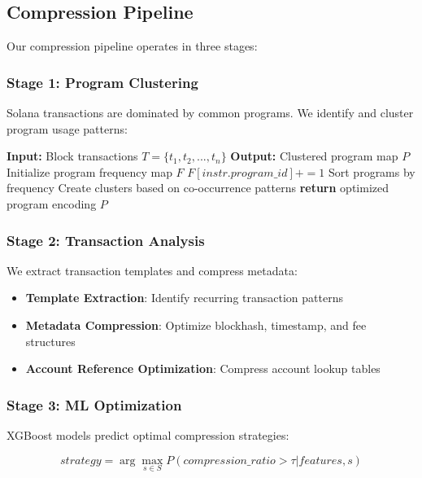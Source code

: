 \documentclass[11pt,a4paper]{article}
\begin{document}
\subsection{Compression Pipeline}

Our compression pipeline operates in three stages:

\subsubsection{Stage 1: Program Clustering}
Solana transactions are dominated by common programs. We identify and cluster program usage patterns:

\begin{algorithm}
\caption{Program Clustering Algorithm}
\begin{algorithmic}[1]
\STATE \textbf{Input:} Block transactions $T = \{t_1, t_2, ..., t_n\}$
\STATE \textbf{Output:} Clustered program map $P$
\STATE Initialize program frequency map $F$
        \STATE $F[instr.program\_id] += 1$
    \ENDFOR
\ENDFOR
\STATE Sort programs by frequency
\STATE Create clusters based on co-occurrence patterns
\STATE \textbf{return} optimized program encoding $P$
\end{algorithmic}
\end{algorithm}

\subsubsection{Stage 2: Transaction Analysis}
We extract transaction templates and compress metadata:

\begin{itemize}
    \item \textbf{Template Extraction}: Identify recurring transaction patterns
    \item \textbf{Metadata Compression}: Optimize blockhash, timestamp, and fee structures
    \item \textbf{Account Reference Optimization}: Compress account lookup tables
\end{itemize}

\subsubsection{Stage 3: ML Optimization}
XGBoost models predict optimal compression strategies:

$$
strategy = \arg\max_{s \in S} P(compression\_ratio > \tau | features, s)
$$
\end{document}
